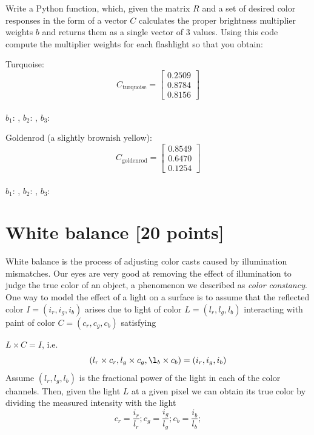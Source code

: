 \documentclass[10pt,letterpaper]{article}
\begin{document}
\begin{enumerate}
Write a Python function, which, given the matrix $R$ and a
set of desired color responses in the form of a vector $C$ calculates
the proper brightness multiplier weights $b$ and returns them as a
single vector of 3 values. Using this code compute the multiplier
weights for each flashlight so that you  obtain:

Turquoise: 
\[
C_{\text{turquoise}} = \left[ \begin{array}{c} 0.2509 \\ 0.8784 \\ 0.8156 \end{array} \right]
\]\\

$b_1$: \underline{\hspace{3cm}}, $b_2$: \underline{\hspace{3cm}}, $b_3$:\underline{\hspace{3cm}}

\vspace{0.5in}
Goldenrod (a slightly brownish yellow): 
\[
C_{\text{goldenrod}} = \left[ \begin{array}{c} 0.8549 \\ 0.6470 \\ 0.1254 \end{array} \right]
\]\\

$b_1$: \underline{\hspace{3cm}}, $b_2$: \underline{\hspace{3cm}}, $b_3$:\underline{\hspace{3cm}}

\end{enumerate}


\section{White balance [20 points]}
White balance is the process of adjusting color casts caused by
illumination mismatches.
Our eyes are very good at removing the effect of
illumination to judge the true color of an object, a phenomenon we
described as \emph{color constancy}.
One way to model the effect of a light on a
surface is to assume that the reflected color $I = (i_r,i_g,i_b)$
arises due to light of color $L= (l_r,l_g,l_b)$ interacting with paint
of color $C = (c_r,c_g,c_b)$ satisfying

	$L \times C = I$, i.e. 
	\[ (l_r \times c_r,l_g \times c_g ,\l_b \times c_b) = (i_r,i_g,i_b)
	\]
Assume $(l_r, l_g, l_b)$ is the fractional power of the light in each
of the color channels.
Then, given the light $L$ at a given pixel we
can obtain its true color by dividing the measured intensity with the
light
\[
	c_r = \frac{i_r}{l_r}; 
	c_g = \frac{i_g}{l_g}; 
	c_b = \frac{i_b}{l_b}; 
\]
\end{document}
